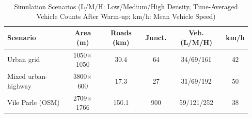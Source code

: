 \begin{table}[t]
\caption{Simulation Scenarios (L/M/H: Low/Medium/High Density, Time-Averaged Vehicle Counts After Warm-up; km/h: Mean Vehicle Speed)}
\label{tab:scenarios}
\centering\footnotesize
\setlength{\tabcolsep}{2pt}
\begin{tabular}{@{}lccccc@{}}
\toprule
Scenario & Area (m) & Roads (km) & Junct. & Veh. (L/M/H) & km/h \\
\midrule
Urban grid & 1050$\times$1050 & 30.4 & 64 & 34/69/161 & 42 \\
Mixed urban-highway & 3800$\times$600 & 17.3 & 27 & 31/69/192 & 50 \\
Vile Parle (OSM) & 2709$\times$1766 & 150.1 & 900 & 59/121/252 & 38 \\
\bottomrule
\end{tabular}
\end{table}
